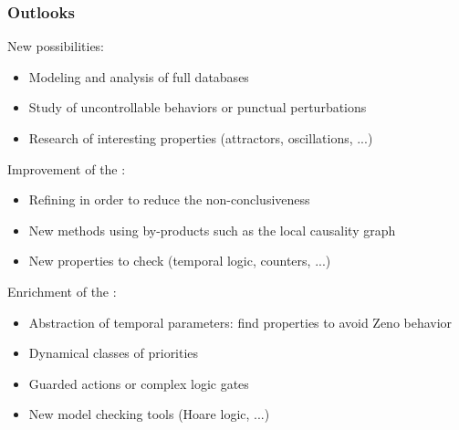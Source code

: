 \begin{frame}[c]
  \frametitle{Outlooks}

New  possibilities:
\begin{itemize}
  \item Modeling and analysis of full databases
  \item Study of uncontrollable behaviors or punctual perturbations
  \item Research of interesting properties (attractors, oscillations, ...)
\end{itemize}

\medskip
Improvement of the :
\begin{itemize}
  \item Refining in order to reduce the non-conclusiveness
  \item New methods using by-products such as the local causality graph
  \item New properties to check (temporal logic, counters, ...)
\end{itemize}

\medskip
Enrichment of the :
\begin{itemize}
  \item Abstraction of temporal parameters: find properties to avoid Zeno behavior
  \item Dynamical classes of priorities
  \item Guarded actions or complex logic gates
  \item New model checking tools (Hoare logic, ...)
\end{itemize}

\end{frame}


% 
% 
% 
% 


